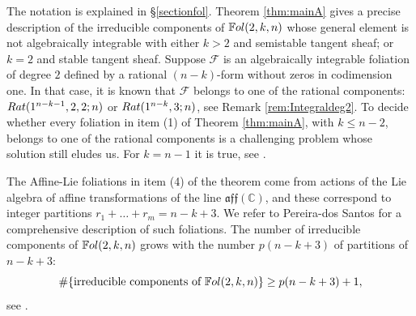 \documentclass[twoside]{amsart}
\numberwithin{equation}{section}
\newcommand{\p}[1]{{\mathbb{P}^{#1}}}
\newcommand{\pn}{{\mathbb{P}^{n}}}
\newcommand{\mf}[1]{\mathfrak{#1}}
\def\CC{{\mathbb{C}}}
\newcommand{\sF}{\mathscr{F}}
\newcommand{\Fol}{\mathbb{F}{\rm ol}}
\newcommand{\lpb}[3]{{\rm LPB }(#1,#2,#3)}
\newcommand{\rat}[2]{{\rm Rat}(#1;#2)}
\newcommand{\logg}[3]{{\rm Log}(#1;#2,#3)}
\newcommand{\exc}[3]{{\rm ALie}(#1,#2;#3)}
\newenvironment{thmintro}[1]
{\renewcommand\theinnerthmintro{#1}\innerthmintro}
{\endinnerthmintro}
\theoremstyle{definition}
\begin{document}
 








The notation is explained in \S\ref{sectionfol}. Theorem \ref{thm:mainA} gives a precise description of the irreducible components of $\Fol(2,k,n)$ whose general element is not algebraically integrable with either $k>2$ and semistable tangent sheaf; or $k=2$ and stable tangent sheaf. Suppose $\sF$ is an algebraically integrable foliation of degree $2$ defined by a rational $(n-k)$-form without zeros in codimension one. In that case, it is known that $\sF$ belongs to one of the rational components: $\rat{1^{n-k-1},2,2}{n}$ or $\rat{1^{n-k},3}{n}$, see Remark \ref{rem:Integraldeg2}. To decide whether every foliation in item (1) of Theorem \ref{thm:mainA}, with $k\leq n-2$, belongs to one of the rational components is a challenging problem whose solution still eludes us. For $k=n-1$ it is true, see \cite[Proposition 3.5]{LPT2}. 

The  Affine-Lie foliations in item (4) of the theorem come from actions of the Lie algebra of affine transformations of the line $\mf{aff(\CC)}$, and these correspond to integer partitions $r_1 + \dots + r_m = n-k+3$. We refer to Pereira-dos Santos \cite{PdS} for a comprehensive description of such foliations. The number of irreducible components of $\Fol(2,k,n)$ grows with the number $p(n-k+3)$ of partitions of $n-k+3$:
\[
\#\{ \text{irreducible components of } \Fol(2,k,n)\} \geq p(n-k+3) +1,
\]
see \cite[Corollary D]{PdS}. 
\end{document}
